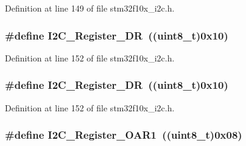 Definition at line 149 of file stm32f10x\+\_\+i2c.\+h.

\subsubsection[{\texorpdfstring{I2\+C\+\_\+\+Register\+\_\+\+DR}{I2C_Register_DR}}]{\setlength{\rightskip}{0pt plus 5cm}\#define I2\+C\+\_\+\+Register\+\_\+\+DR~(({\bf uint8\+\_\+t})0x10)}\hypertarget{group___i2_c__registers_gaea281721e7a8461d90bf59898487c096}{}\label{group___i2_c__registers_gaea281721e7a8461d90bf59898487c096}


Definition at line 152 of file stm32f10x\+\_\+i2c.\+h.

\subsubsection[{\texorpdfstring{I2\+C\+\_\+\+Register\+\_\+\+DR}{I2C_Register_DR}}]{\setlength{\rightskip}{0pt plus 5cm}\#define I2\+C\+\_\+\+Register\+\_\+\+DR~(({\bf uint8\+\_\+t})0x10)}\hypertarget{group___i2_c__registers_gaea281721e7a8461d90bf59898487c096}{}\label{group___i2_c__registers_gaea281721e7a8461d90bf59898487c096}


Definition at line 152 of file stm32f10x\+\_\+i2c.\+h.

\subsubsection[{\texorpdfstring{I2\+C\+\_\+\+Register\+\_\+\+O\+A\+R1}{I2C_Register_OAR1}}]{\setlength{\rightskip}{0pt plus 5cm}\#define I2\+C\+\_\+\+Register\+\_\+\+O\+A\+R1~(({\bf uint8\+\_\+t})0x08)}\hypertarget{group___i2_c__registers_ga706317a00c0d450e95c00efd2afe1836}{}\label{group___i2_c__registers_ga706317a00c0d450e95c00efd2afe1836}


